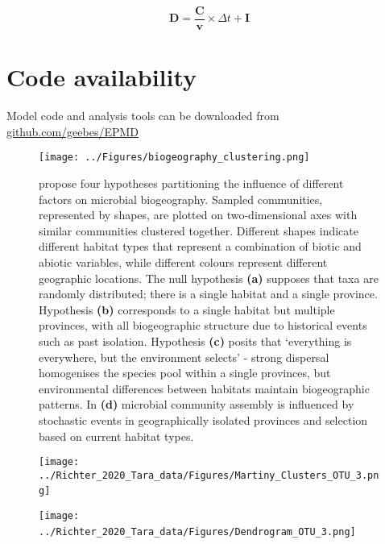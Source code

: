 \documentclass[12pt]{article}
\begin{document}
\begin{equation}
\mathbf{D} = \frac{\mathbf{C}}{\mathbf{v}} \times \Delta t + \mathbf{I}
\end{equation}


\section*{Code availability}

Model code and analysis tools can be downloaded from \url{github.com/geebes/EPMD}


\clearpage

\begin{figure*}[htp!]
    \centering
        \texttt{[image: ../Figures/biogeography\_clustering.png]}
\caption{\citet{Hughes-Martiny:2006} propose four hypotheses partitioning the influence of different factors on microbial biogeography. Sampled communities, represented by shapes, are plotted on two-dimensional axes with similar communities clustered together. Different shapes indicate different habitat types that represent a combination of biotic and abiotic variables, while different colours represent different geographic locations. The null hypothesis \textbf{(a)} supposes that taxa are randomly distributed; there is a single habitat and a single province. Hypothesis \textbf{(b)} corresponds to a single habitat but multiple provinces, with all biogeographic structure due to historical events such as past isolation. Hypothesis \textbf{(c)}
posits that `everything is everywhere, but the environment selects' \citep{BaasBecking:1934} - strong dispersal homogenises the species pool within a single provinces, but environmental differences between habitats maintain biogeographic patterns. In \textbf{(d)} microbial community assembly is influenced by stochastic events in geographically isolated provinces and selection based on current habitat types.}
\label{HughesMartiny}
\end{figure*}

\begin{figure*}[t!]
    \centering
        \texttt{[image: ../Richter\_2020\_Tara\_data/Figures/Martiny\_Clusters\_OTU\_3.png]}\
    \caption{}
\label{Tara_HughesMartiny}
\end{figure*}

\begin{figure*}[t!]
    \centering
        \texttt{[image: ../Richter\_2020\_Tara\_data/Figures/Dendrogram\_OTU\_3.png]}\
    \caption{}
\label{Tara_Dendrogram}
\end{figure*}
\end{document}
